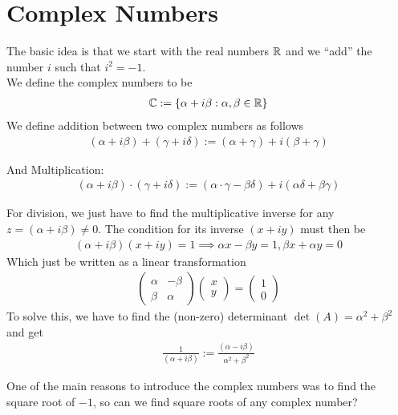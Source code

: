 
\section{Complex Numbers}
The basic idea is that we start with the real numbers $\mathbb{R}$ and we ``add'' the number $i$ such that $i^2 = -1$.\\

We define the complex numbers to be
\begin{align*}
				\mathbb{C} := \{\alpha + i \beta: \alpha, \beta \in \mathbb{R}\}
\end{align*}
We define addition between two complex numbers as follows
\begin{align*}
(\alpha + i \beta) + (\gamma + i \delta) := (\alpha + \gamma) + i(\beta + \gamma)
\end{align*}

And Multiplication:
\begin{align*}
				(\alpha + i\beta) \cdot (\gamma + i \delta) := (\alpha \cdot \gamma - \beta \delta) + i(\alpha \delta + \beta \gamma)
\end{align*}

For division, we just have to find the multiplicative inverse for any $z = ( \alpha + i \beta) \neq 0$. The condition for its inverse $(x + iy)$ must then be
\begin{align*}
				( \alpha + i \beta)(x + iy) = 1 \implies \alpha x - \beta y = 1, \beta x + \alpha y = 0
\end{align*}
Which just be written as a linear transformation
\begin{align*}
				\begin{pmatrix}
								\alpha & - \beta\\
								\beta & \alpha
				\end{pmatrix}
				\begin{pmatrix}
						x\\ y
				\end{pmatrix} = \begin{pmatrix} 1\\0 \end{pmatrix}
\end{align*}
To solve this, we have to find the (non-zero) determinant $\det(A) = \alpha^2 + \beta^2$ and get
\begin{align*}
				\frac{1}{( \alpha + i\beta)} := \frac{( \alpha - i \beta)}{\alpha^2 + \beta^2} 
\end{align*}


One of the main reasons to introduce the complex numbers was to find the square root of $-1$, so can we find square roots of any complex number?\\

